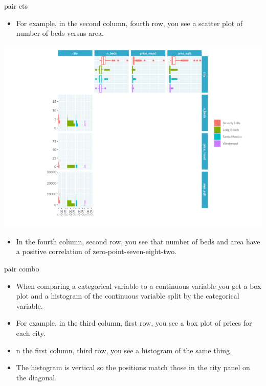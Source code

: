 \documentclass[
  ignorenonframetext,
]{beamer}
\providecommand{\tightlist}{%
  \setlength{\itemsep}{0pt}\setlength{\parskip}{0pt}}
\begin{document}
\begin{frame}{pair cts}
\label{pair-cts-1}
\begin{itemize}
\tightlist
\item
  For example, in the second column, fourth row, you see a scatter plot
  of number of beds versus area.
\end{itemize}

\includegraphics{../images/im93.png}

\begin{itemize}
\tightlist
\item
  In the fourth column, second row, you see that number of beds and area
  have a positive correlation of zero-point-seven-eight-two.
\end{itemize}
\end{frame}

\begin{frame}{pair combo}
\label{pair-combo}
\begin{itemize}
\item
  When comparing a categorical variable to a continuous variable you get
  a box plot and a histogram of the continuous variable split by the
  categorical variable.
\item
  For example, in the third column, first row, you see a box plot of
  prices for each city.
\item
  n the first column, third row, you see a histogram of the same thing.
\item
  The histogram is vertical so the positions match those in the city
  panel on the diagonal.
\end{itemize}
\end{frame}
\end{document}
